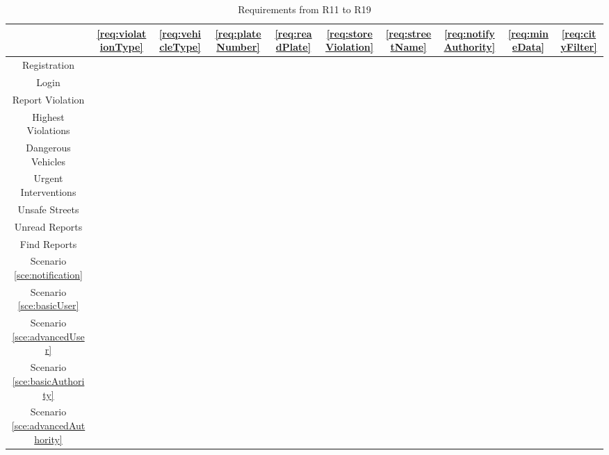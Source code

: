 		\begin{table}[h]
			\centering
			\begin{tabular}{|c|c|c|c|c|c|c|c|c|c|}
				\cline{2-10}
				\multicolumn{1}{c|}{} & \ref{req:violationType} &  \ref{req:vehicleType} & \ref{req:plateNumber} & \ref{req:readPlate} & \ref{req:storeViolation} & \ref{req:streetName} & \ref{req:notifyAuthority} & \ref{req:mineData} & \ref{req:cityFilter} \\
				\hline
				Registration & & & & & & & & & \\
				\hline
				Login & & & & & & & & & \\
				\hline
				Report Violation & \xmark & \xmark & \xmark & \xmark & \xmark & \xmark & \xmark & \xmark & \\
				\hline
				Highest Violations & & & & & & & & \xmark & \xmark \\
				\hline
				Dangerous Vehicles & & & & & & & & \xmark & \xmark \\
				\hline
				Urgent Interventions & & & & & \xmark & & & & \xmark \\
				\hline
				Unsafe Streets & & & & & \xmark & & & & \xmark\\
				\hline
				Unread Reports & & & & & \xmark & & & & \\
				\hline
				Find Reports & & & & & \xmark & & & & \xmark \\
				\hline
				Scenario \ref{sce:notification} & \xmark & \xmark & \xmark & \xmark & \xmark & \xmark & \xmark & \xmark &\\
				\hline
				Scenario \ref{sce:basicUser} & & & & & & & & \xmark & \xmark\\
				\hline
				Scenario \ref{sce:advancedUser} & & & & & \xmark & & & & \xmark\\
				\hline
				Scenario \ref{sce:basicAuthority} & & & & & & & & \xmark & \xmark\\
				\hline
				Scenario \ref{sce:advancedAuthority} & & & & & \xmark & & & & \xmark \\
				\hline
			\end{tabular}
			\vspace{0.4cm}
			\caption{Requirements from R11 to R19}
		\end{table}
			
